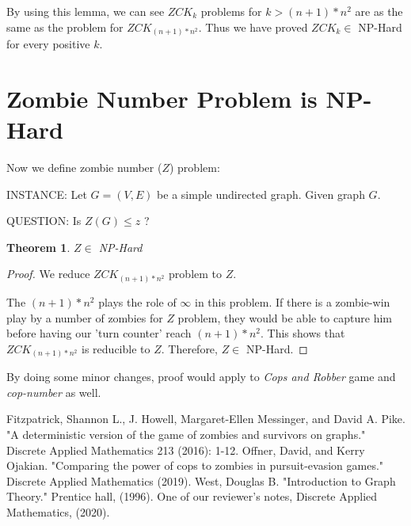 \documentclass[1p]{elsarticle}
\newtheorem{theorem}{Theorem}
\begin{document}
	By using this lemma, we can see $ZCK_k$ problems for $k > (n + 1) * n^2$ are as the same as the problem for $ZCK_{(n
	+ 1) * n^2}$. Thus we have proved $ZCK_k \in$ NP-Hard for every positive $k$.


\section{Zombie Number Problem is NP-Hard}\label{np-zombienumber}

	
	Now we define zombie number ($Z$) problem:

	INSTANCE: Let $G = (V,E)$ be a simple undirected graph. Given graph $G$.

	QUESTION: Is $Z(G) \leq z$ ?

	\begin{theorem}
		$Z \in$ NP-Hard
	\end{theorem}
	\begin{proof}
		We reduce $ZCK_{(n + 1) * n ^ 2}$ problem to $Z$.

		The $(n + 1) * n ^ 2$ plays the role of $\infty$ in this problem. If there is a zombie-win play by a number of
		zombies for $Z$ problem, they would be able to capture him before having our 'turn counter' reach $(n + 1) * n
		^ 2$. This shows that $ZCK_{(n + 1) * n ^ 2}$ is reducible to
		$Z$. Therefore, $Z \in$ NP-Hard.
	\end{proof}

	By doing some minor changes, proof would apply to {\it Cops and Robber} game and {\it cop-number} as well.

\begin{thebibliography}{999}
	
	Fitzpatrick, Shannon L., J. Howell, Margaret-Ellen Messinger, and David A. Pike. "A deterministic version of the
	game of zombies and survivors on graphs." Discrete Applied Mathematics 213 (2016): 1-12.
	Offner, David, and Kerry Ojakian. "Comparing the power of cops to zombies in pursuit-evasion games." Discrete
	Applied Mathematics (2019).
	West, Douglas B. "Introduction to Graph Theory." Prentice hall, (1996).
	One of our reviewer's notes, Discrete Applied Mathematics, (2020).
\end{thebibliography}
	
\end{document}
